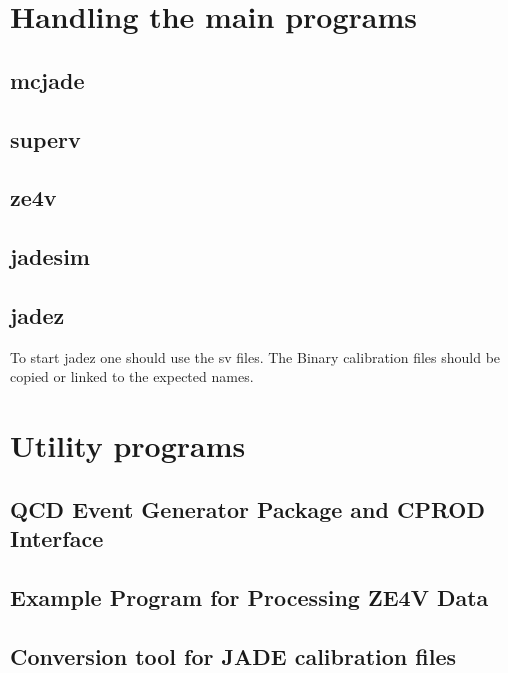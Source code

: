\section{Handling the main programs}


\subsection{mcjade}



\subsection{superv}



\subsection{ze4v}


\subsection{jadesim}


\subsection{jadez}

To start jadez one should use the sv files.
The Binary calibration files should be copied or linked to the expected names.


\section{Utility programs}



\subsection{QCD Event Generator Package and CPROD Interface}


\subsection{Example Program for Processing ZE4V Data}


\subsection{Conversion tool for JADE calibration files}


